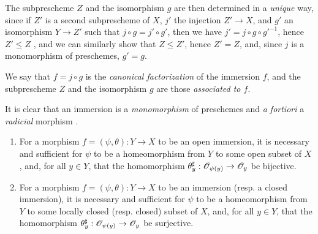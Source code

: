 The subprescheme $Z$ and the isomorphism $g$ are then determined in a \emph{unique} way, since if $Z'$ is a second subprescheme of $X$, $j'$ the injection $Z'\to X$, and $g'$ an isomorphism $Y\to Z'$ such that $j\circ g=j'\circ g'$, then we have $j'=j\circ g\circ{g'}^{-1}$, hence $Z'\leq Z$ , and we can similarly show that $Z\leq Z'$, hence $Z'=Z$, and, since $j$ is a monomorphism of preschemes, $g'=g$.

We say that $f=j\circ g$ is the \emph{canonical factorization} of the immersion $f$, and the subprescheme $Z$ and the isomorphism $g$ are those \emph{associated to $f$}.

It is clear that an immersion is a \emph{monomorphism} of preschemes  and \emph{a fortiori} a \emph{radicial} morphism .

\begin{prop}[4.2.2]
\label{1.4.2.2}
\medskip\noindent
\begin{enumerate}[label={\rm(\alph*)}]
  \item For a morphism $f=(\psi,\theta):Y\to X$ to be an open immersion, it is necessary and sufficient for $\psi$ to be a homeomorphism from $Y$ to some open subset of $X$, and, for all $y\in Y$, that the homomorphism $\theta_y^\sharp:\OO_{\psi(y)}\to\OO_y$ be bijective.
  \item For a morphism $f=(\psi,\theta):Y\to X$ to be an immersion (resp. a closed immersion), it is necessary and sufficient for $\psi$ to be a homeomorphism from $Y$ to some locally closed (resp. closed) subset of $X$, and, for all $y\in Y$, that the homomorphism $\theta_y^\sharp:\OO_{\psi(y)}\to\OO_y$ be surjective.
\end{enumerate}
\end{prop}

